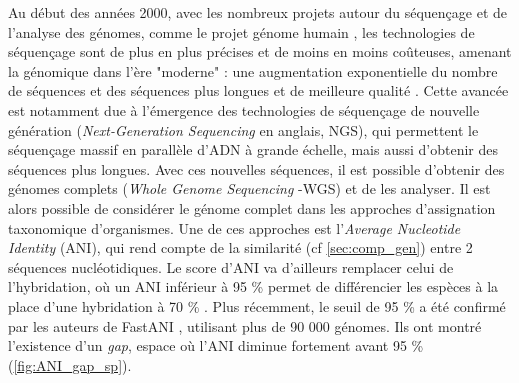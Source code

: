 Au début des années 2000, avec les nombreux projets autour du séquençage et de l'analyse des génomes, comme le projet génome humain \cite{lander_initial_2001}, les technologies de séquençage sont de plus en plus précises et de moins en moins coûteuses, amenant la génomique dans l'ère "moderne" : une augmentation exponentielle du nombre de séquences et des séquences plus longues et de meilleure qualité \cite{hugenholtz_prokaryotic_2021,hu_next-generation_2021}. Cette avancée est notamment due à l’émergence des technologies de séquençage de nouvelle génération (\textit{Next-Generation Sequencing} en anglais, NGS), qui permettent le séquençage massif en parallèle d’ADN à grande échelle, mais aussi d'obtenir des séquences plus longues. Avec ces nouvelles séquences, il est possible d'obtenir des génomes complets (\textit{Whole Genome Sequencing} -WGS) et de les analyser. Il est alors possible de considérer le génome complet dans les approches d'assignation taxonomique d'organismes. Une de ces approches est l'\textit{Average Nucleotide Identity} (ANI), qui rend compte de la similarité (cf \autoref{sec:comp_gen}) entre 2 séquences nucléotidiques. Le score d'ANI va d'ailleurs remplacer celui de l'hybridation, où un ANI inférieur à 95 \% permet de différencier les espèces à la place d'une hybridation à 70 \% \cite{goris_dnadna_2007}. Plus récemment, le seuil de 95 \% a été confirmé par les auteurs de FastANI \cite{jain_high_2018}, utilisant plus de 90 000 génomes. Ils ont montré l'existence d'un \textit{gap}, espace où l'ANI diminue fortement avant 95 \% (\autoref{fig:ANI_gap_sp}).


